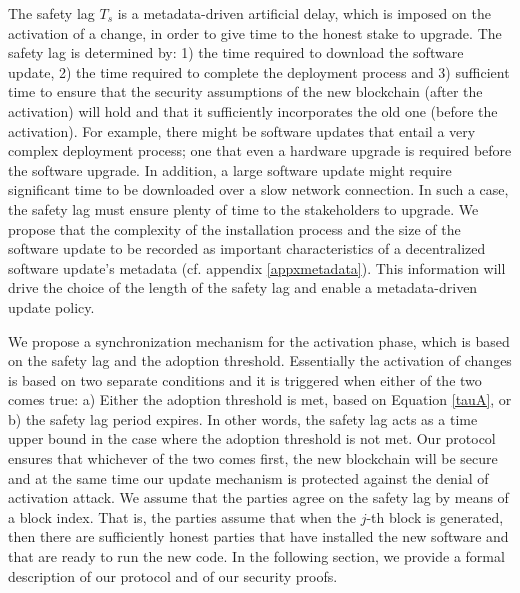 The safety lag $T_s$ is a metadata-driven artificial delay, which is imposed on the activation of a change, in order to give time to the honest stake to upgrade. The safety lag is determined by: 1) the time required to download the software update, 2) the time required to complete the deployment process and 3) sufficient time to ensure that the security assumptions of the new blockchain (after the activation) will hold and that it sufficiently incorporates the old one (before the activation). For example, there might be software updates that entail a very complex deployment process; one that even  a hardware upgrade is required before the software upgrade. In addition, a large software update might require significant time to be downloaded over a slow network connection. In such a case, the safety lag must ensure plenty of time to the stakeholders to upgrade.  
We propose that the complexity of the installation process and the size of the software update to be recorded as important characteristics of a decentralized software update's metadata (cf. appendix \ref{appxmetadata}). This information will drive the choice of the length of the safety lag and enable a metadata-driven update policy.


We propose a synchronization mechanism for the activation phase, which is based on the safety lag and the adoption threshold. Essentially the activation of changes is based on two separate conditions and it is triggered when either of the two comes true: a) Either the adoption threshold is met, based on Equation \ref{tauA}, or b) the safety lag period expires. In other words, the safety lag acts as a time upper bound in the case where the adoption threshold is not met. Our protocol ensures that whichever of the two comes first, the new blockchain will be secure and at the same time our update mechanism is protected against the denial of activation attack. 
We assume that the parties agree on the safety lag by means of a block index. That is, the parties assume that when the $j$-th block 
is generated, then there are sufficiently honest parties that have installed the new software and that are ready to run the new code. 
In the following section, we provide a formal description of our protocol and of our security proofs. 






